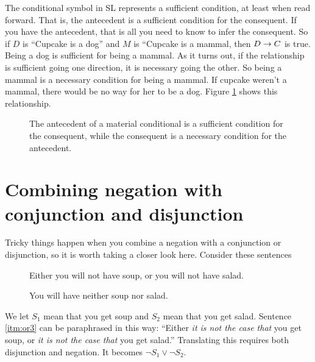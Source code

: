 The conditional symbol in SL represents a sufficient condition, at least when read forward. That is, the antecedent is a sufficient condition for the consequent. If you have the antecedent, that is all you need to know to infer the consequent. So if $D$ is ``Cupcake is a dog'' and $M$ is ``Cupcake is a mammal, then $D \mathrel{\rightarrow} C$ is true. Being a dog is sufficient for being a mammal. As it turns out, if the relationship is sufficient going one direction, it is necessary going the other. So being a mammal is a necessary condition for being a mammal. If cupcake weren't a mammal, there would be no way for her to be a dog. Figure \ref{fig:necessary_and_sufficient} shows this relationship.

\begin{figure}
\centering
{}
\caption{The antecedent of a material conditional is a sufficient condition for the consequent, while the consequent is a necessary condition for the antecedent.}
\label{fig:necessary_and_sufficient}
\end{figure}


\section{Combining negation with conjunction and disjunction}

Tricky things happen when you combine a negation with a conjunction or disjunction, so it is worth taking a closer look here. Consider these sentences

\begin{description}
\item[\label{itm:or3}] Either you will not have soup, or you will not have salad.
\item[\label{itm:or4}] You will have neither soup nor salad.
\end{description}

We let $S_1$ mean that you get soup and $S_2$ mean that you get salad. Sentence \ref{itm:or3} can be paraphrased in this way: ``Either \emph{it is not the case that} you get soup, or \emph{it is not the case that} you get salad.'' Translating this requires both disjunction and negation. It becomes $\lnot S_1 \lor \lnot S_2$.

